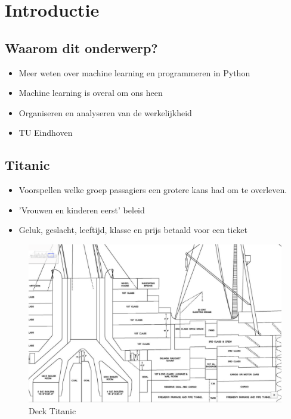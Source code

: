 \documentclass[11pt]{article}
\begin{document}
\section*{Introductie}
\label{sec:orgd9b3c78}
\subsection*{Waarom dit onderwerp?}
\label{sec:orge43ae05}

\begin{itemize}
\item Meer weten over machine learning en programmeren in Python
\item Machine learning is overal om ons heen
\item Organiseren en analyseren van de werkelijkheid
\item TU Eindhoven
\end{itemize}

\subsection*{Titanic}
\label{sec:orgb03a75f}

\begin{itemize}
\item Voorspellen welke groep passagiers een grotere kans had om te overleven.
\item 'Vrouwen en kinderen eerst' beleid
\item Geluk, geslacht, leeftijd, klasse en prijs betaald voor een ticket
\end{itemize}
\begin{figure}[htbp]
\centering
\includegraphics[width=600]{./Deck3.png}
\caption{\label{}
Deck Titanic}
\end{figure}
\end{document}
